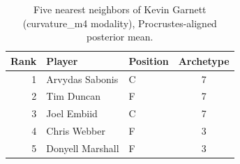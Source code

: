 \begin{table}[htbp]
  \centering\small
  \begin{tabular}{rllc}
    \toprule
    Rank & Player & Position & Archetype \\
    \midrule
    1 & Arvydas Sabonis & C & 7 \\
    2 & Tim Duncan & F & 7 \\
    3 & Joel Embiid & C & 7 \\
    4 & Chris Webber & F & 3 \\
    5 & Donyell Marshall & F & 3 \\
    \bottomrule
  \end{tabular}
  \caption{Five nearest neighbors of Kevin Garnett (curvature_m4 modality), Procrustes-aligned posterior mean.}
  \label{tab:Kevin_Garnett_neighbors_curvature_m4}
\end{table}


